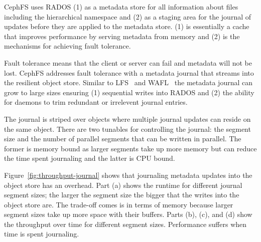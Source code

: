 \documentclass[preprint]{sigplanconf-eurosys}
\begin{document}

CephFS uses RADOS (1) as a metadata store for all information about files
including the hierarchical namespace and (2) as a staging area for the journal
of updates before they are applied to the metadata store. (1) is essentially a
cache that improves performance by serving metadata from memory and (2) is the
mechanisms for achieving fault tolerance.

Fault tolerance means that the client or server can fail and metadata will not
be lost.  CephFS addresses fault tolerance with a metadata journal that streams
into the resilient object store. Similar to LFS~\cite{} and WAFL~\cite{} the
metadata journal can grow to large sizes ensuring (1) sequential writes into
RADOS and (2) the ability for daemons to trim redundant or irrelevent journal
entries. 

The journal is striped over objects where multiple journal updates can reside
on the same object. There are two tunables for controlling the journal: the
segment size and the number of parallel segments that can be written in
parallel. The former is memory bound as larger segments take up more memory but
can reduce the time spent journaling and the latter is CPU bound. 

Figure~\ref{fig:throughput-journal} shows that journaling metadata updates into
the object store has an overhead. Part (a) shows the runtime for different
journal segment sizes; the larger the segment size the bigger that the writes
into the object store are. The trade-off comes is in terms of memory because
larger segment sizes take up more space with their buffers. Parts (b), (c), and
(d) show the throughput over time for different segment sizes. Performance
suffers when time is spent journaling. 
\end{document}
